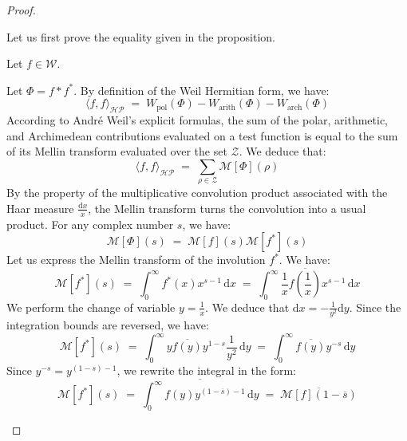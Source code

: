\documentclass[Riemann_Hypothesis.tex]{subfiles}
\begin{document}
\begin{proof}
    \begin{part_proof}
        Let us first prove the equality given in the proposition. \par
        Let $f \in \mathcal{W}$. \par
        Let $\Phi = f * f^*$. By definition of the Weil Hermitian form, we have:
        \begin{equation*}
            \langle f, f \rangle_{\mathcal{HP}} \;=\; W_{\text{pol}}(\Phi) - W_{\text{arith}}(\Phi) - W_{\text{arch}}(\Phi)
        \end{equation*}
        According to André Weil's explicit formulas, the sum of the polar, arithmetic, and Archimedean contributions evaluated on a test function is equal to the sum of its Mellin transform evaluated over the set $\mathcal{Z}$. 
        We deduce that:
        \begin{equation*}
            \langle f, f \rangle_{\mathcal{HP}} \;=\; \sum_{\rho \in \mathcal{Z}} \mathcal{M}[\Phi](\rho)
        \end{equation*}
        By the property of the multiplicative convolution product associated with the Haar measure $\frac{\mathrm{d}x}{x}$, the Mellin transform turns the convolution into a usual product. For any complex number $s$, we have:
        \begin{equation*}
            \mathcal{M}[\Phi](s) \;=\; \mathcal{M}[f](s) \mathcal{M}[f^*](s)
        \end{equation*}
        Let us express the Mellin transform of the involution $f^*$. We have:
        \begin{equation*}
            \mathcal{M}[f^*](s) \;=\; \int_{0}^{\infty} f^*(x) x^{s-1} \, \mathrm{d}x \;=\; \int_{0}^{\infty} \frac{1}{x} \overline{f\left(\frac{1}{x}\right)} x^{s-1} \, \mathrm{d}x
        \end{equation*}
        We perform the change of variable $y = \frac{1}{x}$. We deduce that $\mathrm{d}x = - \frac{1}{y^2} \mathrm{d}y$. Since the integration bounds are reversed, we have:
        \begin{equation*}
            \mathcal{M}[f^*](s) \;=\; \int_{0}^{\infty} y \overline{f(y)} y^{1-s} \frac{1}{y^2} \, \mathrm{d}y \;=\; \int_{0}^{\infty} \overline{f(y)} y^{-s} \, \mathrm{d}y
        \end{equation*}
        Since $y^{-s} = y^{(1 - s) - 1}$, we rewrite the integral in the form:
        \begin{equation*}
            \mathcal{M}[f^*](s) \;=\; \overline{ \int_{0}^{\infty} f(y) y^{(1 - \overline{s}) - 1} \, \mathrm{d}y } \;=\; \overline{\mathcal{M}[f](1 - \overline{s})}

\end{equation*}
\end{part_proof}
\end{proof}
\end{document}
